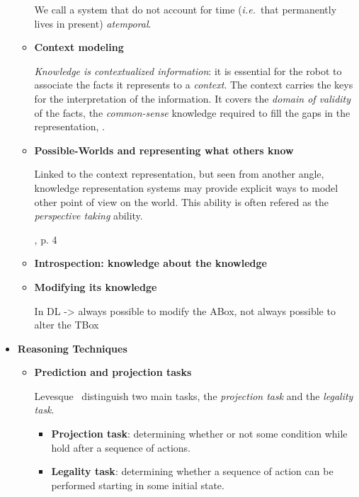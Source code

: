 \documentclass[a4paper]{article}
\newcommand{\ie}{{\textit{i.e.~}}}
\begin{document}
\begin{itemize}
\begin{itemize}
	We call a system that do not account for time (\ie that permanently lives
	in present) \emph{atemporal}.

        \item{\bf Context modeling}
	
	\emph{Knowledge is contextualized information}: it is essential for the robot to associate
	the facts it represents to a \emph{context}. The context carries the keys
	for the interpretation of the information. It covers the \emph{domain of
	validity} of the facts, the \emph{common-sense} knowledge required to
	fill the gaps in the representation, .

        \item{\bf Possible-Worlds and representing what others know}
	
	Linked to the context representation, but seen from another angle,
	knowledge representation systems may provide explicit ways to model other
	point of view on the world. This ability is often refered as the
	\emph{perspective taking} ability.

        \cite{Levesque2008}, p. 4

        \item{\bf Introspection: knowledge about the knowledge}

        \item{\bf Modifying its knowledge}

        In DL -> always possible to modify the ABox, not always possible to alter the TBox

    \end{itemize}

    \item{\bf Reasoning Techniques}

    \begin{itemize}
            \item{\bf Prediction and projection tasks}

            Levesque~\cite{Levesque2008} distinguish two main tasks, the \emph{projection task} and the \emph{legality task}.
        
        \begin{itemize}
            \item{\bf Projection task}: determining whether or not some condition while hold after a sequence of actions.
            \item{\bf Legality task}: determining whether a sequence of action can be performed starting in some initial state.
        \end{itemize}
        

\end{itemize}
\end{itemize}
\end{document}
